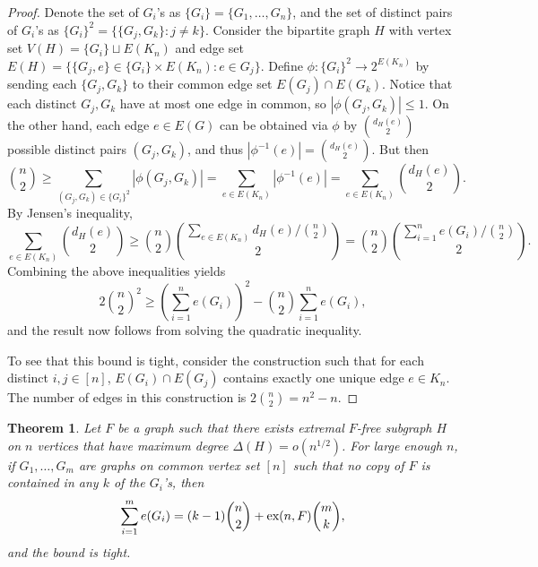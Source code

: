 \documentclass[12pt]{report}
\newtheorem{theorem}{Theorem}[chapter]
\begin{document}
\begin{proof}
  Denote the set of $G_i$'s as $\{G_i\} = \{G_1, \ldots, G_n\}$, and the set of distinct pairs of
  $G_i$'s as $\{G_i\}^2 = \{\{G_j, G_k\} : j \neq k\}$. Consider the bipartite graph $H$ with
  vertex set $V(H) = \{G_i\} \sqcup E(K_n)$ and edge set $E(H) = \{\{G_j, e\} \in \{G_i\} \times
  E(K_n) : e \in G_j\}$. Define $\phi: \{G_i\}^2 \to 2^{E(K_n)}$ by sending each $\{G_j, G_k\}$ to
  their common edge set $E(G_j) \cap E(G_k)$. Notice that each distinct $G_j, G_k$ have at most
  one edge in common, so $|\phi(G_j, G_k)| \leq 1$. On the other hand, each edge $e \in E(G)$ can
  be obtained via $\phi$ by $\binom{d_H(e)}{2}$ possible distinct pairs $(G_j, G_k)$, and thus
  $|\phi^{-1}(e)| = \binom{d_H(e)}{2}$. But then
  \[
    \binom{n}{2} \geq \sum_{(G_j, G_k) \in \{G_i\}^2} |\phi(G_j, G_k)| = \sum_{e \in E(K_n)} |\phi^{-1}(e)| = \sum_{e \in E(K_n)} \binom{d_H(e)}{2}.
  \]
  By Jensen's inequality,
  \[
    \sum_{e \in E(K_n)} \binom{d_H(e)}{2} \geq \binom{n}{2}\binom{\sum_{e \in E(K_n)} d_H(e)/\binom{n}{2}}{2} = \binom{n}{2}\binom{\sum_{i = 1}^n e(G_i)/\binom{n}{2}}{2}.
  \]
  Combining the above inequalities yields
  \[
    2\binom{n}{2}^2 \geq \left(\sum_{i = 1}^n e(G_i)\right)^2 - \binom{n}{2}\sum_{i = 1}^n e(G_i),
  \]
  and the result now follows from solving the quadratic inequality.

  To see that this bound is tight, consider the construction such that for each distinct $i, j \in
  [n]$, $E(G_i) \cap E(G_j)$ contains exactly one unique edge $e \in K_n$. The number of edges in
  this construction is $2\binom{n}{2} = n^2 - n$.
\end{proof}

 

\begin{theorem}
  Let $F$ be a graph such that there exists extremal $F$-free subgraph $H$ on $n$ vertices that have
  maximum degree $\Delta(H) = o(n^{1/2})$. For large enough $n$, if $G_1, \ldots, G_m$ are graphs on
  common vertex set $[n]$ such that no copy of $F$ is contained in any $k$ of the $G_i$'s, then
  \[
    \sum_{i = 1}^m e(G_i) = (k - 1)\binom{n}{2} + \textnormal{ex}(n, F)\binom{m}{k},
  \]
  and the bound is tight.
\end{theorem}
\end{document}
